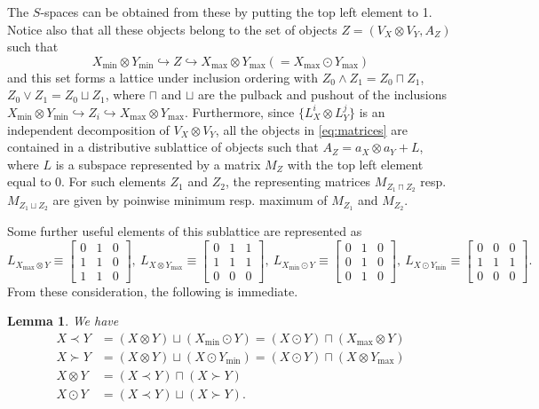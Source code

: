 \documentclass[12pt]{article}
\newtheorem{lemma}{Lemma}
\theoremstyle{definition}
\theoremstyle{remark}
\begin{document}
The $S$-spaces can be obtained from these by putting the top left  element to 1. Notice
also that all these objects belong to the set of objects $Z=(V_X\otimes V_Y, A_Z)$ such
that
\[
X_{\min}\otimes Y_{\min}\hookrightarrow  Z \hookrightarrow X_{\max}\otimes
Y_{\max}(=X_{\max}\odot Y_{\max})
\]
and this set forms a lattice under inclusion ordering with $Z_0\wedge Z_1=Z_0\sqcap Z_1$,
$Z_0\vee Z_1=Z_0\sqcup Z_1$, where $\sqcap$ and $\sqcup$ are the pulback and pushout 
of the inclusions $X_{\min}\otimes Y_{\min}\hookrightarrow Z_i \hookrightarrow
X_{\max}\otimes Y_{\max}$. Furthermore, since $\{L_X^i\otimes L_Y^j\}$ is an independent
decomposition of $V_X\otimes V_Y$, all the objects  in \eqref{eq:matrices} are contained in a
distributive sublattice of objects such that $A_Z=a_X\otimes a_Y+L$, where $L$ is a subspace
represented by a  matrix $M_Z$ with the top left element equal to 0.
For such elements $Z_1$ and $Z_2$, the representing matrices  $M_{Z_1\sqcap Z_2}$ resp.
$M_{Z_1\sqcup Z_2}$ are given by
poinwise minimum resp. maximum of $M_{Z_1}$ and $M_{Z_2}$.


Some further useful elements of this sublattice are represented as
\[
L_{X_{\max}\otimes Y}\equiv\begin{bmatrix}0 & 1 & 0\\ 1 & 1& 0\\ 1& 1&0  \end{bmatrix},\ 
L_{X\otimes Y_{\max}}\equiv\begin{bmatrix}0 & 1 & 1\\ 1 & 1& 1\\ 0& 0&0  \end{bmatrix},\ 
L_{X_{\min}\odot Y}\equiv\begin{bmatrix}0 & 1 & 0\\ 0 & 1& 0\\ 0& 1&0  \end{bmatrix},\ 
L_{X\odot Y_{\min }}\equiv\begin{bmatrix}0 & 0 & 0\\ 1 & 1& 1\\ 0& 0&0  \end{bmatrix}. 
\]
From these consideration, the following is immediate.

\begin{lemma}\label{lemma:lattice} We have
\begin{align*}
X\prec Y &= (X\otimes Y) \sqcup (X_{\min}\odot Y)=(X\odot Y)\sqcap (X_{\max}\otimes Y)\\
X\succ Y &= (X\otimes Y) \sqcup (X\odot Y_{\min})=(X\odot Y)\sqcap (X\otimes Y_{\max})\\
X\otimes Y & = (X\prec Y)\sqcap (X\succ Y)\\
X\odot Y & = (X\prec Y)\sqcup (X\succ Y).
\end{align*}


\end{lemma}
\end{document}
